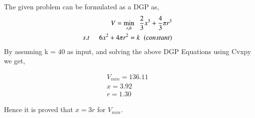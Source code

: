 \documentclass[journal,12pt,twocolumn]{IEEEtran}
\begin{document}
\vspace{0.25cm}

The given problem can be formulated as a DGP as,
\begin{align}
V = \min\limits_{r,h} \hspace{0.2cm} \frac{2}{3} x^3 + \frac{4}{3} \pi r^3\\
s.t \hspace{0.5cm} 6 x^2 + 4 \pi r^2 = k \hspace{0.2cm} (constant)
\label{eq9}
\end{align}
By assuming k = 40 as input, and solving the above DGP Equations using Cvxpy we get,

\begin{align}
V_{min} = 136.11\\
x = 3.92\\
r = 1.30
\end{align} 

Hence it is proved that $ x = 3r $ for $V_{min}$.\\
\vspace{0.5cm}
\end{document}
